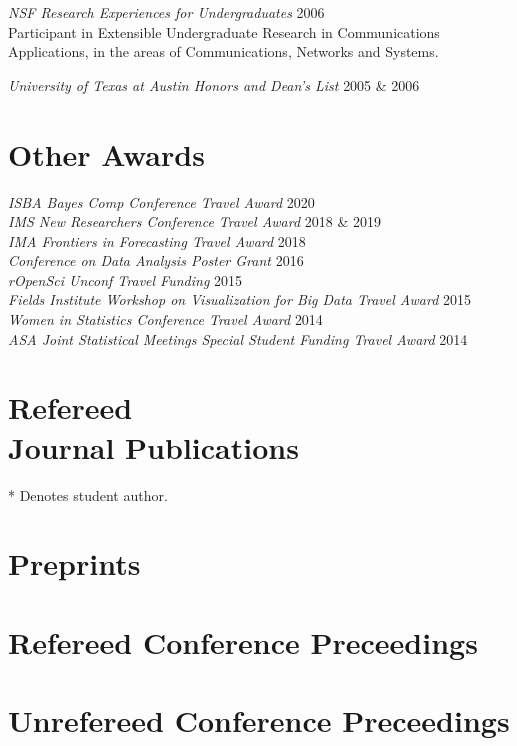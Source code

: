 \documentclass[margin,line]{res}
\begin{document}
\begin{resume}
{\em NSF Research Experiences for Undergraduates } \hfill 2006\\
Participant in Extensible Undergraduate Research in Communications Applications, in the areas of Communications, Networks and Systems.

{\em University of Texas at Austin Honors and Dean's List } \hfill 2005 \& 2006

\section{\sc Other Awards}
{\em ISBA Bayes Comp Conference Travel Award} \hfill 2020 \\
{\em IMS New Researchers Conference Travel Award} \hfill 2018 \& 2019 \\
{\em IMA Frontiers in Forecasting Travel Award} \hfill 2018\\
{\em Conference on Data Analysis Poster Grant } \hfill 2016\\
{\em rOpenSci Unconf Travel Funding } \hfill 2015\\
{\em Fields Institute Workshop on Visualization for Big Data Travel Award } \hfill 2015\\
{\em Women in Statistics Conference Travel Award } \hfill 2014\\
{\em ASA Joint Statistical Meetings Special Student Funding Travel Award } \hfill 2014

\section{\sc Refereed \\ Journal Publications} * Denotes student author.
\printbibliography[keyword=refereed, heading=none, resetnumbers=true]

\section{\sc Preprints}
\printbibliography[keyword=submitted, heading=none, resetnumbers=false]

\printbibliography[keyword=inprep, heading=none]

\section{\sc Refereed Conference Preceedings}
\printbibliography[keyword=conf-ref, heading=none, resetnumbers=false]

\section{\sc Unrefereed Conference Preceedings}
\printbibliography[keyword=conf-unref, heading=none, resetnumbers=false]


\end{resume}
\end{document}
